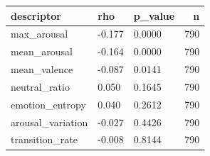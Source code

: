 \begin{tabular}{lllr}
\toprule
descriptor & rho & p\_value & n \\
\midrule
max\_arousal & -0.177 & 0.0000 & 790 \\
mean\_arousal & -0.164 & 0.0000 & 790 \\
mean\_valence & -0.087 & 0.0141 & 790 \\
neutral\_ratio & 0.050 & 0.1645 & 790 \\
emotion\_entropy & 0.040 & 0.2612 & 790 \\
arousal\_variation & -0.027 & 0.4426 & 790 \\
transition\_rate & -0.008 & 0.8144 & 790 \\
\bottomrule
\end{tabular}
